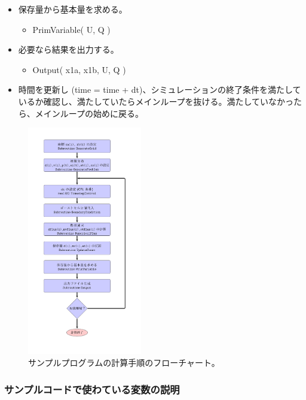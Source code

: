 \begin{enumerate}
\begin{itemize}
          
          \item 保存量から基本量を求める。
          \begin{itemize}
              \item  {\ttfamily PrimVariable( {\color{blue} U}, {\color{red} Q} )}
          \end{itemize}
          

          \item 必要なら結果を出力する。
          \begin{itemize}
              \item {\ttfamily Output( {\color{blue} x1a, x1b, U, Q} )}
          \end{itemize}
          
          \item 時間を更新し ({\ttfamily time = time + dt})、シミュレーションの終了条件を満たしているか確認し、満たしていたらメインループを抜ける。満たしていなかったら、メインループの始めに戻る。
          
     \end{itemize}
\end{enumerate}


\begin{figure}[h]
    \centering
    \includegraphics[width=5cm]{figures/flowchart_HD1.pdf}
    \caption{サンプルプログラムの計算手順のフローチャート。
    }
    \label{fig:fc_HD1}
\end{figure}


\subsubsection{サンプルコードで使わている変数の説明}

